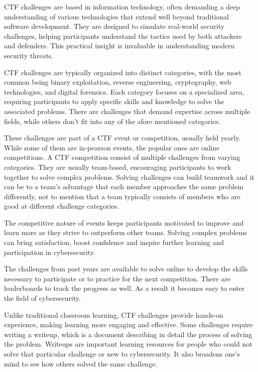 \documentclass[conference]{IEEEtran}
\begin{document}
CTF challenges are based in information technology, often demanding a deep
understanding of various technologies that extend well beyond traditional
software development. They are designed to simulate real-world security
challenges, helping participants understand the tactics used by both attackers
and defenders. This practical insight is invaluable in understanding modern
security threats.

CTF challenges are typically organized into distinct categories, with the most
common being binary exploitation, reverse engineering, cryptography, web
technologies, and digital forensics. Each category focuses on a specialized
area, requiring participants to apply specific skills and knowledge to solve
the associated problems. There are challenges that demand expertise across multiple
fields, while others don't fit into any of the afore mentioned categories.

These challenges are part of a CTF event or competition, usually held yearly.
While some of them are in-pearson events, the popular ones are online competitions.
A CTF competition consist of multiple challenges from varying categories. They
are usually team-based, encouraging participants to work together to solve
complex problems. Solving challenges can build teamwork and it can be to a
team's advantage that each member approaches the same problem differently, not
to mention that a team typically consists of members who are good at different
challenge categories.

The competitive nature of events keeps participants motivated to
improve and learn more as they strive to outperform other teams. Solving
complex problems can bring satisfaction, boost confidence and inspire further
learning and participation in cybersecurity.

The challenges from past years are available to solve online to develop the
skills necessary to participate or to practice for the next competition. There are
leaderboards to track the progress as well. As a result it becomes easy to
enter the field of cybersecurity.

Unlike traditional classroom learning, CTF challenges provide hands-on
experience, making learning more engaging and effective. Some challenges
require writing a writeup, which is a document describing in detail the process
of solving the problem. Writeups are important learning resources for people
who could not solve that particular challenge or new to cybersecurity. It also
broadens one's mind to see how others solved the same challenge.
\end{document}
